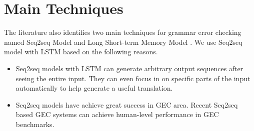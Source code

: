 \section{Main Techniques}
The literature also identifies two main techniques for grammar error checking named Seq2seq Model and Long Short-term Memory Model \cite{lu2019advances}. 
We use Seq2seq model with LSTM based on the following reasons.
\begin{itemize}
    \item Seq2seq models with LSTM can generate arbitrary output sequences after seeing the entire input. They can even focus in on specific parts of the input automatically to help generate a useful translation.
    \item Seq2seq models have achieve great success in GEC area. Recent Seq2seq based GEC systems \cite{chollampatt2018multilayer,ge2018fluency,ge2018reaching}  can achieve human-level performance in GEC benchmarks.
\end{itemize}

